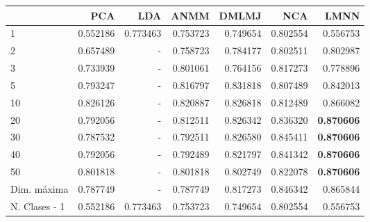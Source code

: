 \begin{tabular}{lrrrrrr}
\toprule
{} &       PCA &       LDA &      ANMM &     DMLMJ &       NCA &      LMNN \\
\midrule
1             &  0.552186 &  0.773463 &  0.753723 &  0.749654 &  0.802554 &  0.556753 \\
2             &  0.657489 &  -        &  0.758723 &  0.784177 &  0.802511 &  0.802987 \\
3             &  0.733939 &  -        &  0.801061 &  0.764156 &  0.817273 &  0.778896 \\
5             &  0.793247 &  -        &  0.816797 &  0.831818 &  0.807489 &  0.842013 \\
10            &  0.826126 &  -        &  0.820887 &  0.826818 &  0.812489 &  0.866082 \\
20            &  0.792056 &  -        &  0.812511 &  0.826342 &  0.836320 &  \textbf{0.870606} \\
30            &  0.787532 &  -        &  0.792511 &  0.826580 &  0.845411 &  \textbf{0.870606} \\
40            &  0.792056 &  -        &  0.792489 &  0.821797 &  0.841342 &  \textbf{0.870606} \\
50            &  0.801818 &  -        &  0.801818 &  0.802749 &  0.822078 &  \textbf{0.870606} \\
Dim. máxima   &  0.787749 &  -        &  0.787749 &  0.817273 &  0.846342 &  0.865844 \\
N. Clases - 1 &  0.552186 &  0.773463 &  0.753723 &  0.749654 &  0.802554 &  0.556753 \\
\bottomrule
\end{tabular}
